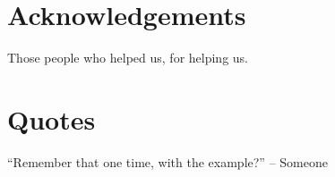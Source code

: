 \documentclass[sheet]{game}
\begin{document}
\section*{Acknowledgements}

\begin{itemz}

  \item Those people who helped us, for helping us.

\end{itemz}


\section*{Quotes}

\begin{itemz}

  \item ``Remember that one time, with the example?'' -- Someone

\end{itemz}
\end{document}
